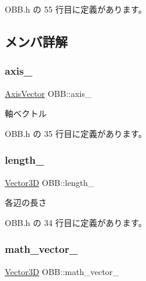  O\+B\+B.\+h の 55 行目に定義があります。



\subsection{メンバ詳解}
\mbox{\label{class_o_b_b_ab002fad8cf0a9a08fc50407dc849aab1}} 
\subsubsection{\texorpdfstring{axis\+\_\+}{axis\_}}
{\footnotesize\ttfamily \mbox{\hyperlink{class_axis_vector}{Axis\+Vector}} O\+B\+B\+::axis\+\_\+\hspace{0.3cm}{\ttfamily [private]}}



軸ベクトル 



 O\+B\+B.\+h の 35 行目に定義があります。

\mbox{\label{class_o_b_b_a04dc4d7036d26215f9c33a7cad633947}} 
\subsubsection{\texorpdfstring{length\+\_\+}{length\_}}
{\footnotesize\ttfamily \mbox{\hyperlink{class_vector3_d}{Vector3D}} O\+B\+B\+::length\+\_\+\hspace{0.3cm}{\ttfamily [private]}}



各辺の長さ 



 O\+B\+B.\+h の 34 行目に定義があります。

\mbox{\label{class_o_b_b_ae2bb48bafa38fdf30f0e383da193152c}} 
\subsubsection{\texorpdfstring{math\+\_\+vector\+\_\+}{math\_vector\_}}
{\footnotesize\ttfamily \mbox{\hyperlink{class_vector3_d}{Vector3D}} O\+B\+B\+::math\+\_\+vector\+\_\+\hspace{0.3cm}{\ttfamily [private]}}



